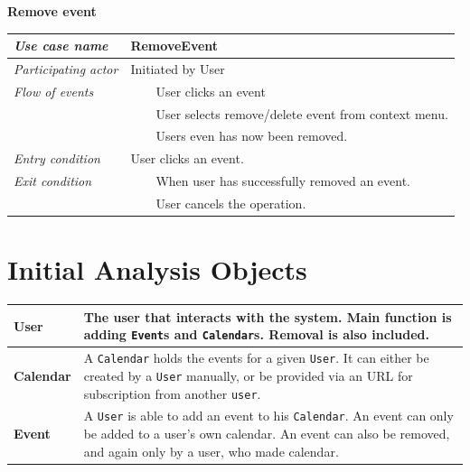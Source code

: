 \documentclass[10pt]{report}
\newcommand{\tabitem}{~~\llap{\textbullet}~~}
\numberwithin{equation}{section} %
\numberwithin{figure}{section} %
\numberwithin{table}{section} %
\begin{document}
\begin{table}[H]
\noindent \textbf{Remove event}\\
\begin{tabularx}{\textwidth}{l X}
\midrule
\textit{Use case name} & RemoveEvent \\ \midrule
\textit{Participating actor} & Initiated by User \\ \midrule
\textit{Flow of events} & \tabitem User clicks an event\\
                                       & \tabitem User selects remove/delete
                                       event from context menu.\\
                                       & \tabitem Users even has now been removed.\\
                        \midrule
\textit{Entry condition} & User clicks an event.\\ \midrule
\textit{Exit condition} & \tabitem When user has successfully removed an event. \\
						& \tabitem User cancels the operation.\\
                        \midrule
\end{tabularx}
\end{table}

\section{Initial Analysis Objects}
\begin{table}[H]
\begin{tabularx}{\textwidth}{l X}
\midrule
\textbf{User} & The user that interacts with the system. Main function is adding
  \texttt{Event}s and \texttt{Calendar}s. Removal is also included.\\ \midrule
\textbf{Calendar} & A \texttt{Calendar} holds the events for a given
  \texttt{User}. It can either be created by a \texttt{User} manually, or be
  provided via an URL for subscription from another \texttt{user}. \\ \midrule
\textbf{Event} & A \texttt{User} is able to add an event to his
  \texttt{Calendar}. An event can only be added to a user's own calendar. An event can also be removed, and again only by a user, who made calendar.\\ \midrule
\end{tabularx}
\end{table}
\end{document}
